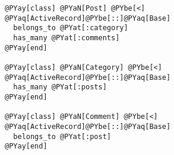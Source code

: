 \begin{Verbatim}[commandchars=@\[\]]
@PYay[class] @PYaN[Post] @PYbe[<] @PYaq[ActiveRecord]@PYbe[::]@PYaq[Base]
  belongs_to @PYat[:category]
  has_many @PYat[:comments]
@PYay[end]

@PYay[class] @PYaN[Category] @PYbe[<] @PYaq[ActiveRecord]@PYbe[::]@PYaq[Base]
  has_many @PYat[:posts]
@PYay[end]

@PYay[class] @PYaN[Comment] @PYbe[<] @PYaq[ActiveRecord]@PYbe[::]@PYaq[Base]
  belongs_to @PYat[:post]
@PYay[end]
\end{Verbatim}
